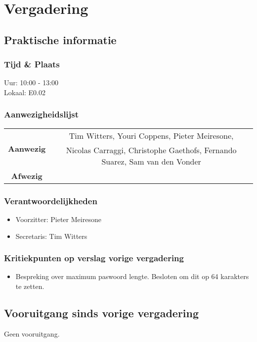 \section{Vergadering \MeetingDate}
\subsection{Praktische informatie}
\subsubsection{Tijd \& Plaats}
Uur: 10:00 - 13:00
\\
Lokaal: E0.02

\subsubsection{Aanwezigheidslijst}
\begin{table}[htbp]
	\centering
	\begin{tabular}{c|c}
		\multirow{2}{*}{\textbf{Aanwezig}} & Tim Witters, Youri Coppens, Pieter Meiresone, \\
		& Nicolas Carraggi,  Christophe Gaethofs, Fernando Suarez, Sam van den Vonder \\
		\hline
		\textbf{Afwezig} & \\
	\end{tabular}
\end{table}


\subsubsection{Verantwoordelijkheden}
\begin{itemize}
	\item Voorzitter: Pieter Meiresone
	\item Secretaris: Tim Witters
\end{itemize}


\subsubsection{Kritiekpunten op verslag vorige vergadering}
\begin{itemize}
	\item Bespreking over maximum paswoord lengte. Besloten om dit op 64 karakters te zetten. 
\end{itemize}


\subsection{Vooruitgang sinds vorige vergadering} \label{sec:Vooruitgang}
Geen vooruitgang.

